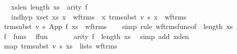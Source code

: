 \begin{isabellebody}
\ \ \ xs{}len{}\ {}length\ xs\ {}\ arity\ f{}\isanewline
\ \ \ ind{}hyp{}\ {}{}x{}set\ xs{}\ x\ {}\ wf{}trms\ {}\ {}x{}\ trm{}subst\ v\ s\ x\ {}\ wf{}trms{}{}\isanewline
\ \ \isamarkupfalse%
\ {}trm{}subst\ v\ s\ {}App\ f\ xs{}\ {}\ wf{}trms{}\isanewline
\ \ \isamarkupfalse%
\ {}simp{}\ rule\ wf{}trms{}func{}of\ {}\ {}length\ xs{}{}{}\isanewline
\ \ \ \ \isamarkupfalse%
\ {}f\ {}\ funs{}\ \isamarkupfalse%
\ f{}fun\ \isamarkupfalse%
\isanewline
\ \ \ \ \isamarkupfalse%
\ {}arity\ f\ {}\ length\ xs{}\ \isamarkupfalse%
\ {}simp\ add{}\ xs{}len{}\isanewline
\ \ \ \ \isamarkupfalse%
\ {}map\ {}trm{}subst\ v\ s{}\ xs\ {}\ lists\ wf{}trms{}\isanewline

\end{isabellebody}
